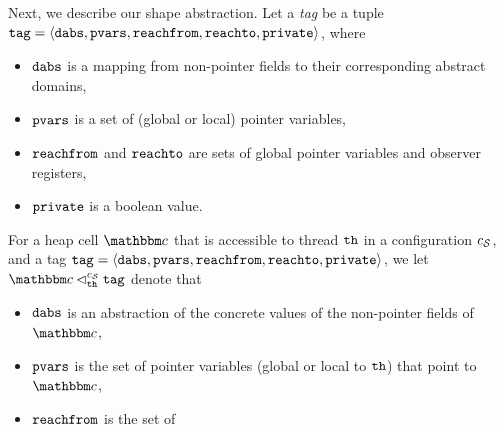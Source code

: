 Next, we describe our shape abstraction. Let a
{\em tag} be a tuple $\mathtt{tag} = \left\langle\mathtt{dabs},\mathtt{pvars},\mathtt{reachfrom},\mathtt{reachto},\mathtt{private}\right\rangle$, where
\begin{itemize}
\item
  $\mathtt{dabs}$ is a mapping from non-pointer fields to their corresponding abstract
  domains,
\item
  $\mathtt{pvars}$ is a set of (global or local) pointer variables,
 \item
   $\mathtt{reachfrom}$ and $\mathtt{reachto}$ are sets of global pointer variables and observer registers,
  \item $\mathtt{private}$ is a boolean value.
\end{itemize}
For a heap cell $\cell$ that is accessible to thread ${\tt th}$ 
in a configuration $c_{\mathcal S}$, and a tag
$\mathtt{tag} = \left\langle\mathtt{dabs},\mathtt{pvars},\mathtt{reachfrom},\mathtt{reachto},\mathtt{private}\right\rangle$, we let $\cell \satfrag{\thread}{\sconf} \atag$ denote that
\begin{itemize}
\item
  $\mathtt{dabs}$ is an abstraction of the concrete values of the non-pointer fields of $\cell$,
\item
  $\mathtt{pvars}$ is the set of pointer variables (global or
  local to ${\tt th}$) that point to $\cell$,
\item
  $\mathtt{reachfrom}$ is the set of
\end{itemize}
